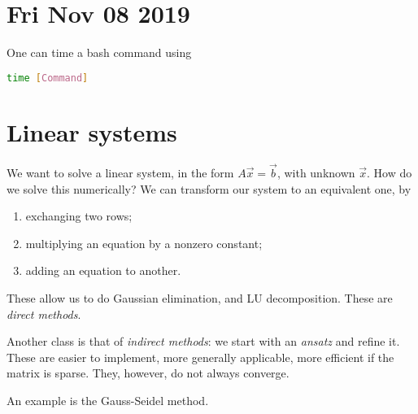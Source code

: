 \documentclass[main.tex]{subfiles}
\begin{document}
\section*{Fri Nov 08 2019}

One can time a bash command using

\begin{lstlisting}[language=bash]
time [Command]
\end{lstlisting}

\section{Linear systems}

We want to solve a linear system, in the form \(A \vec{x} = \vec{b}\), with unknown \(\vec{x}\). 
How do we solve this numerically?
We can transform our system to an equivalent one, by
\begin{enumerate}
    \item exchanging two rows;
    \item multiplying an equation by a nonzero constant;
    \item adding an equation to another.
\end{enumerate}

These allow us to do Gaussian elimination, and LU decomposition. These are \emph{direct methods}.

Another class is that of \emph{indirect methods}: we start with an \emph{ansatz} and refine it. These are easier to implement, more generally applicable, more efficient if the matrix is sparse. 
They, however, do not always converge.

An example is the Gauss-Seidel method.
\end{document}

